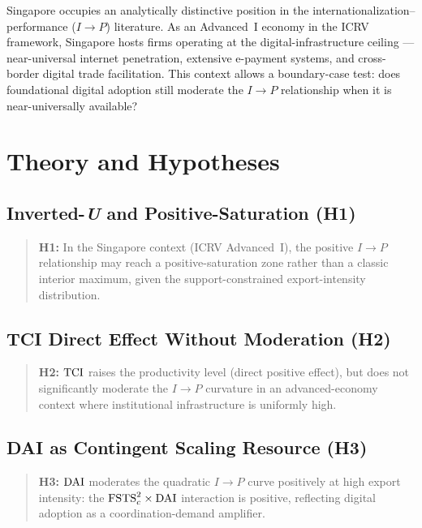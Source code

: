 \documentclass[smallextended]{svjour3}   %
\begin{document}
Singapore occupies an analytically distinctive position in the
internationalization--performance (\(I \to P\)) literature.  As an
Advanced~I economy in the ICRV framework, Singapore hosts firms operating at
the digital-infrastructure ceiling --- near-universal internet penetration,
extensive e-payment systems, and cross-border digital trade facilitation.  This
context allows a boundary-case test: does foundational digital adoption still
moderate the \(I \to P\) relationship when it is near-universally available?

\section{Theory and Hypotheses}
\label{sec:theory}

\subsection{Inverted-\textit{U} and Positive-Saturation (H1)}

\begin{quote}
\textbf{H1:} In the Singapore context (ICRV Advanced~I), the positive
\(I \to P\) relationship may reach a positive-saturation zone rather than a
classic interior maximum, given the support-constrained export-intensity
distribution.
\end{quote}

\subsection{TCI Direct Effect Without Moderation (H2)}

\begin{quote}
\textbf{H2:} \({\mathrm{TCI}}\) raises the productivity level (direct positive effect),
but does not significantly moderate the \(I \to P\) curvature in an
advanced-economy context where institutional infrastructure is uniformly high.
\end{quote}

\subsection{DAI as Contingent Scaling Resource (H3)}

\begin{quote}
\textbf{H3:} \({\mathrm{DAI}}\) moderates the quadratic \(I \to P\) curve positively at
high export intensity: the \({\mathrm{FSTS}_{c}^{2}} \times {\mathrm{DAI}}\) interaction is positive,
reflecting digital adoption as a coordination-demand amplifier.
\end{quote}
\end{document}
